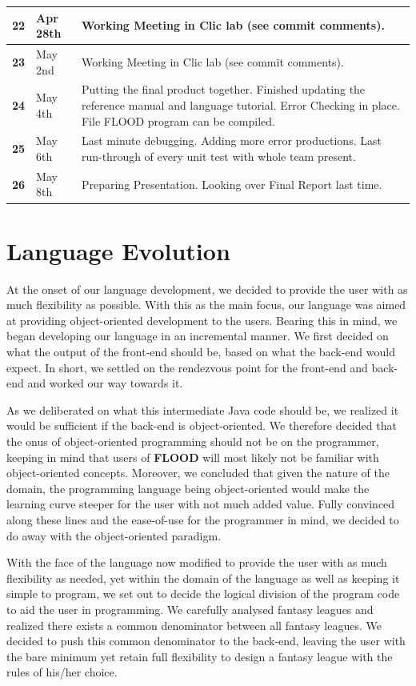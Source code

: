 \documentclass[12pt]{report}
\begin{document}
\begin{flushleft}
\begin{singlespace}
\begin{tabular}{ | p{2cm} | p{1.8cm} | p{12cm} | }
\hline
\textbf{22} & Apr 28th & Working Meeting in Clic lab (see commit comments).\\
\hline
\textbf{23} & May 2nd & Working Meeting in Clic lab (see commit comments).\\
\hline
\textbf{24} & May 4th & Putting the final product together. Finished updating the reference manual and language tutorial. Error Checking in place. File FLOOD program can be compiled.\\
\hline
\textbf{25} & May 6th & Last minute debugging. Adding more error productions. Last run-through of every unit test with whole team present.\\
\hline
\textbf{26} & May 8th & Preparing Presentation. Looking over Final Report last time.\\
\hline
\end{tabular}
\end{singlespace}
\end{flushleft}


\chapter{Language Evolution}

At the onset of our language development, we decided to provide the user with as much flexibility as possible. With this as the main focus, our language was aimed at providing object-oriented development to the users. Bearing this in mind, we began developing our language in an incremental manner. We first decided on what the output of the front-end should be, based on what the back-end would expect. In short, we settled on the rendezvous point for the front-end and back-end and worked our way towards it.

As we deliberated on what this intermediate Java code should be, we realized it would be sufficient if the back-end is object-oriented. We therefore decided that the onus of object-oriented programming should not be on the programmer, keeping in mind that users of \textbf{FLOOD} will most likely not be familiar with object-oriented concepts. Moreover, we concluded that given the nature of the domain, the programming language being object-oriented would make the learning curve steeper for the user with not much added value. Fully convinced along these lines and the ease-of-use for the programmer in mind, we decided to do away with the object-oriented paradigm.
 
With the face of the language now modified to provide the user with as much flexibility as needed, yet within the domain of the language as well as keeping it simple to program, we set out to decide the logical division of the program code to aid the user in programming. We carefully analysed fantasy leagues and realized there exists a common denominator between all fantasy leagues. We decided to push this common denominator to the back-end, leaving the user with the bare minimum yet retain full flexibility to design a fantasy league with the rules of his/her choice.
\end{document}
